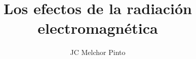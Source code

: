 \documentclass[12pt,addpoints,answers]{guia}
\title{Los efectos de la radiación electromagnética}
\author{JC Melchor Pinto}
\begin{document}
\INFO%
\begin{questions}
    \questionboxed[25]{}
    \questionboxed[25]{}
\end{questions}
\end{document}
